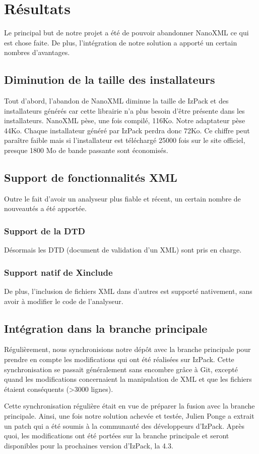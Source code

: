 \section{Résultats}
Le principal but de notre projet a été de pouvoir abandonner NanoXML ce qui est chose faite.
De plus, l'intégration de notre solution a apporté un certain nombres d'avantages.
\subsection{Diminution de la taille des installateurs}
Tout d'abord, l'abandon de NanoXML diminue la taille de IzPack et des installateurs générés car cette librairie n'a plus besoin d'être présente dans les installateurs.
NanoXML pèse, une fois compilé, 116Ko.
Notre adaptateur pèse 44Ko.
Chaque installateur généré par IzPack perdra donc 72Ko.
Ce chiffre peut paraître faible mais si l'installateur est téléchargé 25000 fois sur le site officiel, presque 1800 Mo de bande passante sont économisés.
\subsection{Support de fonctionnalités XML}
Outre le fait d'avoir un analyseur plus fiable et récent, un certain nombre de nouveautés a été apportée.
\subsubsection{Support de la DTD}
Désormais les DTD (document de validation d'un XML) sont pris en charge.
\subsubsection{Support natif de Xinclude}
De plus, l'inclusion de fichiers XML dans d'autres est supporté nativement, sans avoir à modifier le code de l'analyseur.
\subsection{Intégration dans la branche principale}
Régulièrement, nous synchronisions notre dépôt avec la branche principale pour prendre en compte les modifications qui ont été réalisées sur IzPack.
Cette synchronisation se passait généralement sans encombre grâce à Git, excepté quand les modifications concernaient la manipulation de XML et que les fichiers étaient conséquents (>3000 lignes).

Cette synchronisation régulière était en vue de préparer la fusion avec la branche principale.
Ainsi, une fois notre solution achevée et testée, Julien Ponge a extrait un patch qui a été soumis à la communauté des développeurs d'IzPack.
Après quoi, les modifications ont été portées sur la branche principale et seront disponibles pour la prochaines version d'IzPack, la 4.3.


